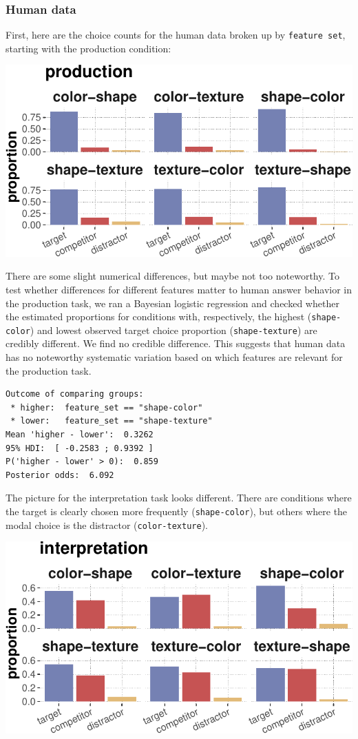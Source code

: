 \documentclass{article}
\begin{document}
\hypertarget{human-data}{%
\subsubsection{Human data}\label{human-data}}

First, here are the choice counts for the human data broken up by
\texttt{feature\ set}, starting with the production condition:

\includegraphics{00-pics/human-data-counts-per-featureSet-1.pdf}

There are some slight numerical differences, but maybe not too
noteworthy. To test whether differences for different features matter to
human answer behavior in the production task, we ran a Bayesian logistic
regression and checked whether the estimated proportions for conditions
with, respectively, the highest (\texttt{shape-color}) and lowest
observed target choice proportion (\texttt{shape-texture}) are credibly
different. We find no credible difference. This suggests that human data
has no noteworthy systematic variation based on which features are
relevant for the production task.

\begin{verbatim}
Outcome of comparing groups:
 * higher:  feature_set == "shape-color"
 * lower:   feature_set == "shape-texture"
Mean 'higher - lower':  0.3262
95% HDI:  [ -0.2583 ; 0.9392 ]
P('higher - lower' > 0):  0.859
Posterior odds:  6.092
\end{verbatim}

The picture for the interpretation task looks different. There are
conditions where the target is clearly chosen more frequently
(\texttt{shape-color}), but others where the modal choice is the
distractor (\texttt{color-texture}).

\includegraphics{00-pics/human-data-counts-per-featureSet-interpretation-1.pdf}
\end{document}
